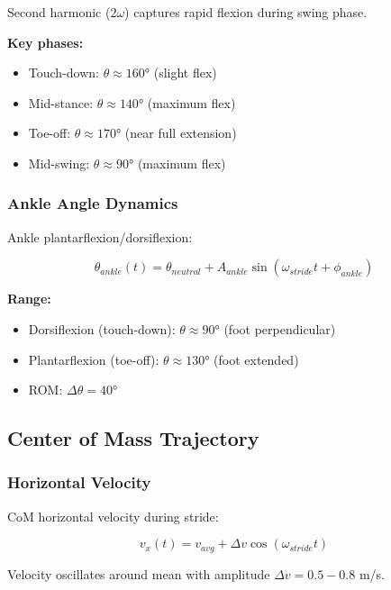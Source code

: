 Second harmonic ($2\omega$) captures rapid flexion during swing phase.

\textbf{Key phases:}
\begin{itemize}
\item Touch-down: $\theta \approx 160°$ (slight flex)
\item Mid-stance: $\theta \approx 140°$ (maximum flex)
\item Toe-off: $\theta \approx 170°$ (near full extension)
\item Mid-swing: $\theta \approx 90°$ (maximum flex)
\end{itemize}

\subsubsection{Ankle Angle Dynamics}

Ankle plantarflexion/dorsiflexion:

\begin{equation}
\theta_{ankle}(t) = \theta_{neutral} + A_{ankle} \sin(\omega_{stride} t + \phi_{ankle})
\label{eq:ankle_angle}
\end{equation}

\textbf{Range:}
\begin{itemize}
\item Dorsiflexion (touch-down): $\theta \approx 90°$ (foot perpendicular)
\item Plantarflexion (toe-off): $\theta \approx 130°$ (foot extended)
\item ROM: $\Delta\theta = 40°$
\end{itemize}

\subsection{Center of Mass Trajectory}

\subsubsection{Horizontal Velocity}

CoM horizontal velocity during stride:

\begin{equation}
v_x(t) = v_{avg} + \Delta v \cos(\omega_{stride} t)
\label{eq:horizontal_velocity}
\end{equation}

Velocity oscillates around mean with amplitude $\Delta v = 0.5-0.8$ m/s.

